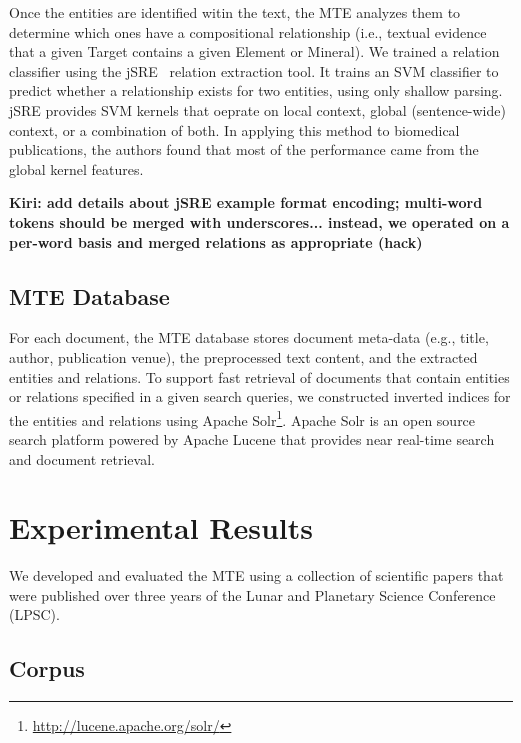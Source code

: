 \documentclass[letterpaper]{article} %
\begin{document}
Once the entities are identified witin the text, the MTE analyzes them
to determine which ones have a compositional relationship (i.e.,
textual evidence that a given Target contains a given Element or
Mineral).  
%
We trained a relation classifier using the jSRE~\cite{giuliano:jsre06}
relation extraction tool.  It trains an SVM classifier to predict
whether a relationship exists for two entities, using only shallow
parsing.  jSRE provides SVM kernels that oeprate on local context,
global (sentence-wide) context, or a combination of both.  In applying
this method to biomedical publications, the authors found that most of
the performance came from the global kernel features.

{\bf Kiri: add details about jSRE example format encoding;
multi-word tokens should be merged with underscores... instead, we
operated on a per-word basis and merged relations as appropriate (hack)}

\subsection{MTE Database}

For each document, the MTE database stores document meta-data (e.g.,
title, author, publication venue), the preprocessed text content, and
the extracted entities and relations.  To support fast retrieval of
documents that contain entities or relations specified in a given
search queries, we constructed inverted indices for the entities and
relations using Apache
Solr\footnote{\url{http://lucene.apache.org/solr/}}. Apache Solr is an
open source search platform powered by Apache Lucene that provides
near real-time search and document retrieval. 
 
\section{Experimental Results}

We developed and evaluated the MTE using a collection of scientific
papers that were published over three years of the Lunar and Planetary
Science Conference (LPSC).

\subsection{Corpus}
\end{document}
